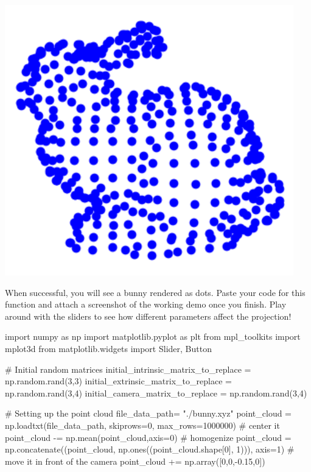 \begin{enumerate}[(a)]
\includegraphics[width=0.5\linewidth]{images/bunny.png}

When successful, you will see a bunny rendered as dots. Paste your code for this function and attach a screenshot of the working demo once you finish. Play around with the sliders to see how different parameters affect the projection!

\begin{tcolorbox}[enhanced jigsaw,breakable,pad at break*=1mm,colback=white!5!white,colframe=green!75!black,height fixed for=all]
        
    \begin{python}
import numpy as np
import matplotlib.pyplot as plt
from mpl_toolkits import mplot3d
from matplotlib.widgets import Slider, Button

# Initial random matrices
initial_intrinsic_matrix_to_replace = np.random.rand(3,3)
initial_extrinsic_matrix_to_replace = np.random.rand(3,4)
initial_camera_matrix_to_replace = np.random.rand(3,4)

# Setting up the point cloud
file_data_path= "./bunny.xyz"
point_cloud = np.loadtxt(file_data_path, skiprows=0, max_rows=1000000)
# center it
point_cloud -= np.mean(point_cloud,axis=0)
# homogenize
point_cloud = np.concatenate((point_cloud, np.ones((point_cloud.shape[0], 1))), axis=1)
# move it in front of the camera
point_cloud += np.array([0,0,-0.15,0])


\end{python}
\end{tcolorbox}
\end{enumerate}
